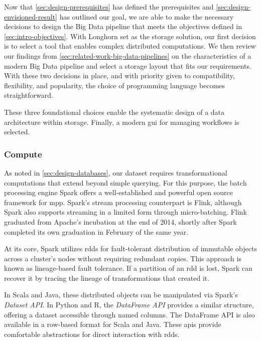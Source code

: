 Now that \cref{sec:design-prerequisites} has defined the prerequisites and \cref{sec:design-envisioned-result} has outlined our goal, we are able to make the necessary decisions to design the Big Data pipeline that meets the objectives defined in \cref{sec:intro-objectives}.
With Longhorn set as the storage solution, our first decision is to select a tool that enables complex distributed computations.
We then review our findings from \cref{sec:related-work-big-data-pipelines} on the characteristics of a modern Big Data pipeline and select a storage layout that fits our requirements.
With these two decisions in place, and with priority given to compatibility, flexibility, and popularity, the choice of programming language becomes straightforward.

These three foundational choices enable the systematic design of a data architecture within storage.
Finally, a modern \ac{gui} for managing workflows is selected.


\subsubsection{Compute}
\label{sec:design-compute}

As noted in \cref{sec:design-databases}, our dataset requires transformational computations that extend beyond simple querying.
For this purpose, the batch processing engine Spark offers a well-established and powerful open source framework for \ac{mpp}.
Spark's stream processing counterpart is Flink, although Spark also supports streaming in a limited form through micro-batching.
Flink graduated from Apache's incubation at the end of 2014, shortly after Spark completed its own graduation in February of the same year.

At its core, Spark utilizes \acp{rdd} for fault-tolerant distribution of immutable objects across a cluster's nodes without requiring redundant copies.
This approach is known as lineage-based fault tolerance.
If a partition of an \ac{rdd} is lost, Spark can recover it by tracing the lineage of transformations that created it.

In Scala and Java, these distributed objects can be manipulated via Spark's \textit{Dataset API}.
In Python and R, the \textit{DataFrame API} provides a similar structure, offering a dataset accessible through named columns.
The DataFrame API is also available in a row-based format for Scala and Java.
These \acp{api} provide comfortable abstractions for direct interaction with \acp{rdd}.

